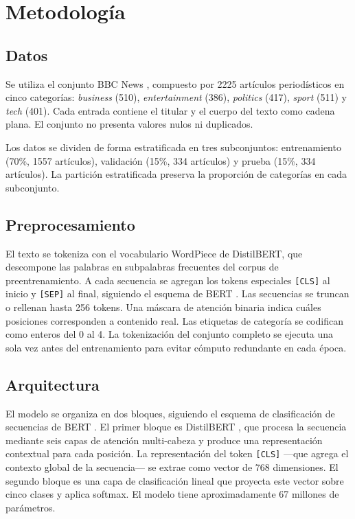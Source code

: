 \documentclass[letterpaper, 10 pt, conference]{latex_template/ieeeconf}
\begin{document}
\section{Metodología}

\subsection{Datos}

Se utiliza el conjunto BBC News \cite{c4}, compuesto por 2225 artículos periodísticos en cinco categorías: \textit{business} (510), \textit{entertainment} (386), \textit{politics} (417), \textit{sport} (511) y \textit{tech} (401). Cada entrada contiene el titular y el cuerpo del texto como cadena plana. El conjunto no presenta valores nulos ni duplicados.

Los datos se dividen de forma estratificada en tres subconjuntos: entrenamiento (70\%, 1557 artículos), validación (15\%, 334 artículos) y prueba (15\%, 334 artículos). La partición estratificada preserva la proporción de categorías en cada subconjunto.

\subsection{Preprocesamiento}

El texto se tokeniza con el vocabulario WordPiece de DistilBERT, que descompone las palabras en subpalabras frecuentes del corpus de preentrenamiento. A cada secuencia se agregan los tokens especiales \texttt{[CLS]} al inicio y \texttt{[SEP]} al final, siguiendo el esquema de BERT \cite{c2}. Las secuencias se truncan o rellenan hasta 256 tokens. Una máscara de atención binaria indica cuáles posiciones corresponden a contenido real. Las etiquetas de categoría se codifican como enteros del 0 al 4. La tokenización del conjunto completo se ejecuta una sola vez antes del entrenamiento para evitar cómputo redundante en cada época.

\subsection{Arquitectura}

El modelo se organiza en dos bloques, siguiendo el esquema de clasificación de secuencias de BERT \cite{c2}. El primer bloque es DistilBERT \cite{c5}, que procesa la secuencia mediante seis capas de atención multi-cabeza y produce una representación contextual para cada posición. La representación del token \texttt{[CLS]} —que agrega el contexto global de la secuencia— se extrae como vector de 768 dimensiones. El segundo bloque es una capa de clasificación lineal que proyecta este vector sobre cinco clases y aplica softmax. El modelo tiene aproximadamente 67 millones de parámetros.
\end{document}
